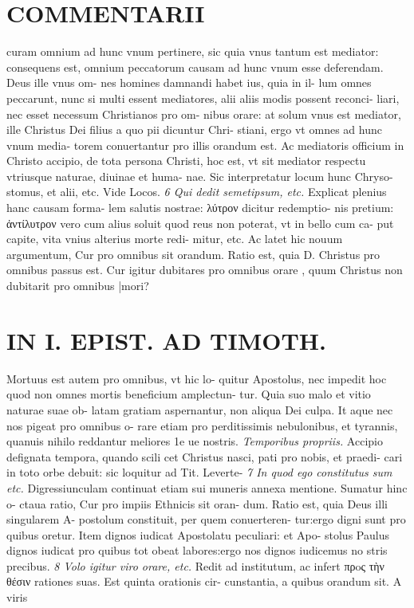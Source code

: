 \documentclass{article}
\begin{document}
\begin{pages}
\section*{COMMENTARII }\pstart curam omnium ad hunc vnum pertinere, sic quia vnus tantum est mediator: consequens est, omnium peccatorum causam ad hunc vnum esse deferendam. Deus ille vnus om- nes homines damnandi habet ius, quia in il- lum omnes peccarunt, nunc si multi essent mediatores, alii aliis modis possent reconci- liari, nec esset necessum Christianos pro om- nibus orare: at solum vnus est mediator, ille Christus Dei filius a quo pii dicuntur Chri- stiani, ergo vt omnes ad hunc vnum media- torem conuertantur pro illis orandum est. Ac mediatoris officium in Christo accipio, de tota persona Christi, hoc est, vt sit mediator respectu vtriusque naturae, diuinae et huma- nae. Sic interpretatur locum hunc Chryso- stomus, et alii, etc. Vide Locos.  \pend
\textit{6 Qui dedit semetipsum, etc. }\pstart Explicat plenius hanc causam forma- lem salutis nostrae: λύτρον dicitur redemptio- nis pretium: ἀντίλυτρον vero cum alius soluit quod reus non poterat, vt in bello cum ca- put capite, vita vnius alterius morte redi- mitur, etc.  \pend\pstart Ac latet hic nouum argumentum, Cur pro omnibus sit orandum. Ratio est, quia D. Christus pro omnibus passus est. Cur igitur dubitares pro omnibus orare , quum Christus non dubitarit pro omnibus |mori?  \pend
\section*{IN I. EPIST. AD TIMOTH. }
\marginpar{[ p.5 ]}\pstart Mortuus est autem pro omnibus, vt hic lo- quitur Apostolus, nec impedit hoc quod non omnes mortis beneficium amplectun- tur. Quia suo malo et vitio naturae suae ob- latam gratiam aspernantur, non aliqua Dei culpa. It aque nec nos pigeat pro omnibus o- rare etiam pro perditissimis nebulonibus, et tyrannis, quanuis nihilo reddantur meliores 1e ue nostris.  \pend
\textit{Temporibus propriis. }\pstart Accipio defignata tempora, quando scili cet Christus nasci, pati pro nobis, et praedi- cari in toto orbe debuit: sic loquitur ad Tit. Leverte-  \pend
\textit{7 In quod ego constitutus sum etc. }\pstart Digressiunculam continuat etiam sui muneris annexa mentione. Sumatur hinc o- ctaua ratio, Cur pro impiis Ethnicis sit oran- dum. Ratio est, quia Deus illi singularem A- postolum constituit, per quem conuerteren- tur:ergo digni sunt pro quibus oretur. Item dignos iudicat Apostolatu peculiari: et Apo- stolus Paulus dignos iudicat pro quibus tot obeat labores:ergo nos dignos iudicemus no stris precibus.  \pend
\textit{8 Volo igitur viro orare, etc. }\pstart Redit ad institutum, ac infert πρoς τὴν θέσιν rationes suas. Est quinta orationis cir- cunstantia, a quibus orandum sit. A viris  \pend
\marginpar{[ p.52 ]}

\end{pages}
\end{document}
